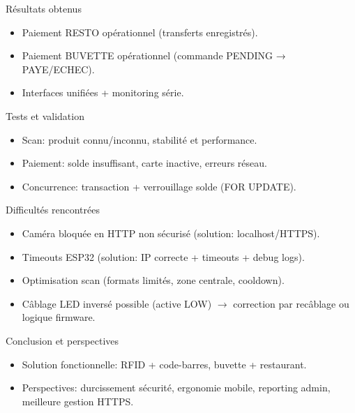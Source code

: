 \documentclass[aspectratio=169,11pt]{beamer}
\begin{document}
\begin{frame}{Résultats obtenus}
  \begin{itemize}
    \item Paiement RESTO opérationnel (transferts enregistrés).
    \item Paiement BUVETTE opérationnel (commande PENDING → PAYE/ECHEC).
    \item Interfaces unifiées + monitoring série.
  \end{itemize}
\end{frame}

\begin{frame}{Tests et validation}
  \begin{itemize}
    \item Scan: produit connu/inconnu, stabilité et performance.
    \item Paiement: solde insuffisant, carte inactive, erreurs réseau.
    \item Concurrence: transaction + verrouillage solde (FOR UPDATE).
  \end{itemize}
\end{frame}

\begin{frame}{Difficultés rencontrées}
  \begin{itemize}
    \item Caméra bloquée en HTTP non sécurisé (solution: localhost/HTTPS).
    \item Timeouts ESP32 (solution: IP correcte + timeouts + debug logs).
    \item Optimisation scan (formats limités, zone centrale, cooldown).
    \item Câblage LED inversé possible (active LOW) \(\rightarrow\) correction par recâblage ou logique firmware.
  \end{itemize}
\end{frame}

\begin{frame}{Conclusion et perspectives}
  \begin{itemize}
    \item Solution fonctionnelle: RFID + code-barres, buvette + restaurant.
    \item Perspectives: durcissement sécurité, ergonomie mobile, reporting admin, meilleure gestion HTTPS.
  \end{itemize}
\end{frame}
\end{document}

